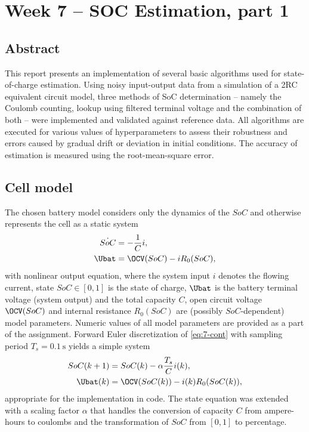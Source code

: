 
\chapter{Week 7 -- SOC Estimation, part 1}

\section{Abstract}
This report presents an implementation of several basic algorithms used for state-of-charge estimation. Using noisy input-output data from a simulation of a 2RC equivalent circuit model,
three methods of SoC determination -- namely the Coulomb counting, lookup using filtered terminal voltage and the combination of both -- were implemented and validated against reference data. All algorithms are executed for various values of hyperparameters to assess their robustness and errors caused by gradual drift or deviation in initial conditions. The accuracy of estimation is measured using the root-mean-square error.

\section{Cell model}

The chosen battery model considers only the dynamics of the $SoC$ and otherwise represents the cell as a static system
\begin{equation}
    \begin{split}
        \dot{SoC} &= -\frac{1}{C} i, \\
        \Ubat &= \OCV(SoC) - i R_0(SoC),
    \end{split}
    \label{eq:7-cont}
\end{equation}
with nonlinear output equation, where the system input $i$ denotes the flowing current, state $SoC \in \left[0, 1\right]$ is the state of charge, $\Ubat$ is the battery terminal voltage (system output) and the total capacity $C$, open circuit voltage $\OCV(SoC)$ and internal resistance $R_0(SoC)$ are (possibly $SoC$-dependent) model parameters. Numeric values of all model parameters are provided as a part of the assignment. Forward Euler discretization of \eqref{eq:7-cont} with sampling period $T_s = \SI{0.1}{\second}$ yields a simple system
\begin{equation}
    \begin{split}
        SoC(k+1) &= SoC(k) - \alpha \frac{T_s}{C} i(k), \\
        \Ubat(k) &= \OCV(SoC(k)) - i(k) R_0(SoC(k)),
    \end{split}
    \label{eq:7-disc}
\end{equation}
appropriate for the implementation in code. The state equation was extended with a scaling factor $\alpha$ that handles the conversion of capacity $C$ from ampere-hours to coulombs and the transformation of $SoC$ from $\left[0, 1\right]$ to percentage.

